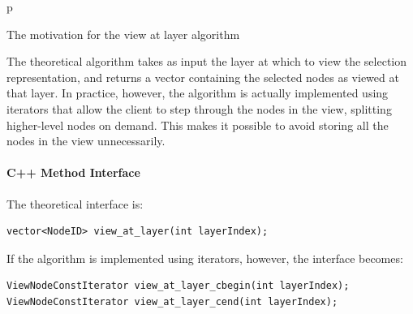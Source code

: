 \begin{stusubfig}{p}
	\hspace{4mm}%
\caption{The motivation for the view at layer algorithm}
\label{fig:ipfs-selection-viewatlayer-motivation}
\end{stusubfig}

The theoretical algorithm takes as input the layer at which to view the selection representation, and returns a vector containing the selected nodes as viewed at that layer. In practice, however, the algorithm is actually implemented using iterators that allow the client to step through the nodes in the view, splitting higher-level nodes on demand. This makes it possible to avoid storing all the nodes in the view unnecessarily.

\paragraph{C++ Method Interface}

The theoretical interface is:

\begin{lstlisting}[style=Prototype]
vector<NodeID> view_at_layer(int layerIndex);
\end{lstlisting}

\noindent If the algorithm is implemented using iterators, however, the interface becomes:

\begin{lstlisting}[style=Prototype]
ViewNodeConstIterator view_at_layer_cbegin(int layerIndex);
ViewNodeConstIterator view_at_layer_cend(int layerIndex);
\end{lstlisting}

